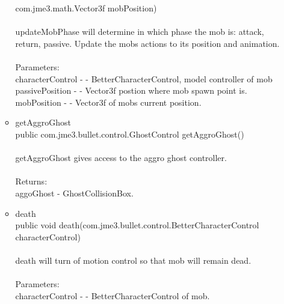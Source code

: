 \documentclass[letterpaper]{article}
\begin{document}
\begin{itemize}
\begin{itemize}
															com.jme3.math.Vector3f mobPosition) \\ \\
															updateMobPhase will determine in which phase the mob is: attack, return, passive. Update the mobs actions to its position and animation. \\ \\
															Parameters: \\
															characterControl - - BetterCharacterControl, model controller of mob
															passivePosition - - Vector3f postion where mob spawn point is. \\
															mobPosition - - Vector3f of mobs current position.
													\item	getAggroGhost \\
															public com.jme3.bullet.control.GhostControl getAggroGhost() \\ \\
															getAggroGhost gives access to the aggro ghost controller. \\ \\
															Returns: \\
															aggoGhost - GhostCollisionBox. \\
													\item	death \\
															public void death(com.jme3.bullet.control.BetterCharacterControl characterControl) \\ \\
															death will turn of motion control so that mob will remain dead. \\ \\
															Parameters: \\
															characterControl - - BetterCharacterControl of mob. \\
												\end{itemize}
									\end{itemize}
									
									\vspace{0.2in}
\end{document}
